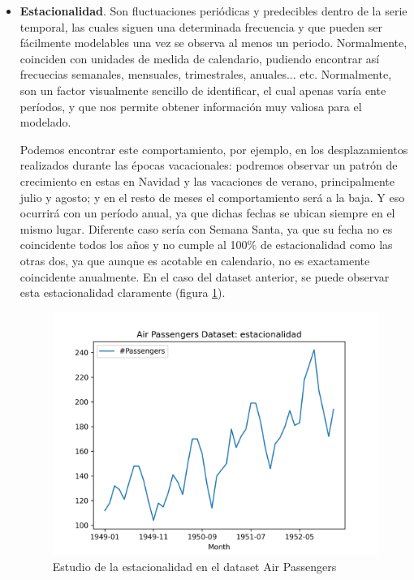 \begin{itemize}
    \item \textbf{Estacionalidad}. Son fluctuaciones periódicas y predecibles dentro de la serie temporal, las cuales siguen una determinada frecuencia y que pueden ser fácilmente modelables una vez se observa al menos un periodo. Normalmente, coinciden con unidades de medida de calendario, pudiendo encontrar así frecuecias semanales, mensuales, trimestrales, anuales... etc. Normalmente, son un factor visualmente sencillo de identificar, el cual apenas varía ente períodos, y que nos permite obtener información muy valiosa para el modelado.

    Podemos encontrar este comportamiento, por ejemplo, en los desplazamientos realizados durante las épocas vacacionales: podremos observar un patrón de crecimiento en estas en Navidad y las vacaciones de verano, principalmente julio y agosto; y en el resto de meses el comportamiento será a la baja. Y eso ocurrirá con un período anual, ya que dichas fechas se ubican siempre en el mismo lugar. Diferente caso sería con Semana Santa, ya que su fecha no es coincidente todos los años y no cumple al 100\% de estacionalidad como las otras dos, ya que aunque es acotable en calendario, no es exactamente coincidente anualmente. En el caso del dataset anterior, se puede observar esta estacionalidad claramente (figura \ref{season}).

    \begin{figure}[h] %
        \centering
        \includegraphics[scale=0.6]{img/season}
        \caption{Estudio de la estacionalidad en el dataset Air Passengers}
        \label{season}
    \end{figure}


\end{itemize}
